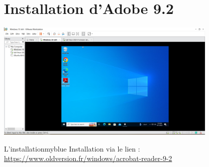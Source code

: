 \section{Installation d'Adobe 9.2}

\begin{center}
    \includegraphics[width=0.8\textwidth]{Question/SC/3-adobe.PNG}
\end{center}

\vspace{0.35cm}

\begin{prettyBox}{L'installation}{myblue}
Installation via le lien : \href{https://www.oldversion.fr/windows/acrobat-reader-9-2}{https://www.oldversion.fr/windows/acrobat-reader-9-2}
\end{prettyBox}

